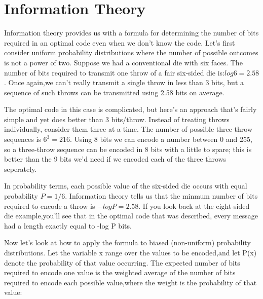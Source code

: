 \section{Information Theory}
\begin{frame}
Information theory provides us with a formula for determining the number of bits required in an optimal code even when we don't know the code. Let's first consider uniform probability distributions where the number of possible outcomes is not a power of two. Suppose we had a conventional die with six faces. The number of bits required to transmit one throw of a fair six-sided die is:$ log 6 = 2.58$. Once again,we can't really transmit a single throw in less than 3 bits, but a sequence of such throws can be transmitted using 2.58 bits on average. 
\end{frame}
\begin{frame}
\large
The optimal code in this case is complicated, but here's an approach that's fairly simple and yet does better than 3 bits/throw. Instead of treating throws individually, consider them three at a time. The number of possible three-throw sequences is $6^3= 216$. Using 8 bits we can encode a number between 0 and 255, so a three-throw sequence can be encoded in 8 bits with a little to spare; this is better than the 9 bits we'd need if we encoded each of the three throws seperately.
\end{frame}
\begin{frame}
\large
In probability terms, each possible value of the six-sided die occurs with equal probability $P=1/6$. Information theory tells us that the minmum number of bits required to encode a throw is $-log P = 2.58$. If you look back at the eight-sided die example,you'll see that in the optimal code that was described, every message had a length exactly equal to -log P bits.
\end{frame}
\begin{frame}
\large Now let's look at how to apply the formula to biased (non-uniform) probability distributions. Let the variable x range over the values to be encoded,and let P(x) denote the probability of that value occurring. The expected number of bits required to encode one value is the weighted average of the number of bits required to encode each possible value,where the weight is the probability of that value: 
\end{frame}


